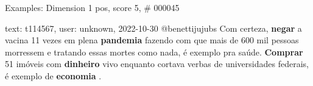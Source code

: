 \begin{frame}{Examples: Dimension 1 pos, score 5, \# 000045}
\footnotesize
\begin{exampleblock}{text: t114567, user: unknown, 2022-10-30}
@benettijujubs Com certeza, \textbf{negar} a vacina 11 vezes em plena 
\textbf{pandemia} fazendo com que mais de 600 mil pessoas morressem e tratando 
essas mortes como nada, é exemplo pra saúde. \textbf{Comprar} 51 imóveis com 
\textbf{dinheiro} vivo enquanto cortava verbas de universidades federais, é 
exemplo de \textbf{economia} .  
\end{exampleblock}
\end{frame}
